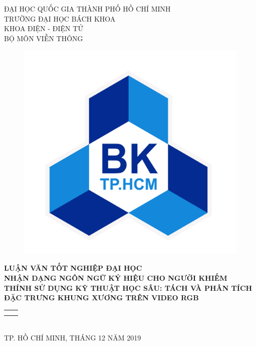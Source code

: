 \begin{titlepage}

\newcommand{\HRule}{\rule{\linewidth}{0.5mm}}
\centering

\large ĐẠI HỌC QUỐC GIA THÀNH PHỐ HỒ CHÍ MINH \\
TRƯỜNG ĐẠI HỌC BÁCH KHOA \\
KHOA ĐIỆN - ĐIỆN TỬ  \\
BỘ MÔN VIỄN THÔNG  \\ [0.8cm]

\begin{figure}[!ht]
    \centering
    \includegraphics[scale=0.3]{front_pages/Logo_BK.png}
    \label{fig:logo}
\end{figure}

\bfseries
\Large{LUẬN VĂN TỐT NGHIỆP ĐẠI HỌC} \\[1.3cm]

\LARGE{NHẬN DẠNG NGÔN NGỮ KÝ HIỆU CHO NGƯỜI KHIẾM THÍNH SỬ DỤNG KỸ THUẬT HỌC SÂU: TÁCH VÀ PHÂN TÍCH ĐẶC TRƯNG KHUNG XƯƠNG TRÊN VIDEO RGB} \\ [2.1cm]

\normalfont
\normalsize
\begin{tabular}{r l}
    \fontsize{14pt}{0pt}{\selectfont{GVHD:}} & \fontsize{14pt}{0pt}{\selectfont{PGS.TS HÀ HOÀNG KHA}} \\
    \fontsize{14pt}{0pt}{\selectfont{SVTH:}} & \fontsize{14pt}{0pt}{\selectfont{NGUYỄN THÀNH ĐẠT - 1510698}}  					
                        
\end{tabular} 
\\ [2.1cm]

TP. HỒ CHÍ MINH, THÁNG 12 NĂM 2019
\end{titlepage}


